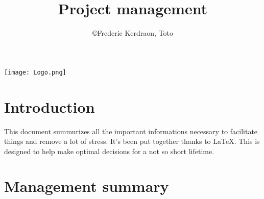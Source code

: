 \documentclass[8pt]{article} %
\title{Project management}
\author{\copyright Frederic Kerdraon, Toto}
\begin{document}
\maketitle
\hspace*{-1cm}\texttt{[image: Logo.png]}
\tableofcontents

\section{Introduction}

This document summurizes all the important informations necessary to facilitate things and remove a lot of stress. It's been put together thanks to \LaTeX. This is designed to help make optimal decisions for a not so short lifetime.

%


\newcommand{\slice}[4]{
  \pgfmathparse{0.5*#1+0.5*#2}
  \let\midangle\pgfmathresult

   slice
  \draw[thick,fill=black!10] (0,0) -- (#1:1) arc (#1:#2:1) -- cycle;

   outer label
  \node[label=\midangle:#4] at (\midangle:1) {};

   inner label
  \pgfmathparse{min((#2-#1-10)/110*(-0.3),0)}
  \let\temp\pgfmathresult
  \pgfmathparse{max(\temp,-0.5) + 0.8}
  \let\innerpos\pgfmathresult
  \node at (\midangle:\innerpos) {#3};
}

\section{Management summary}


\end{document}
